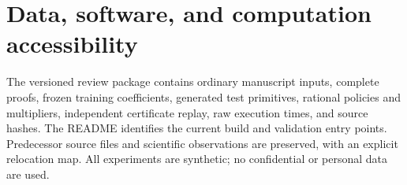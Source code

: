 \documentclass[11pt,letterpaper]{article}
\theoremstyle{definition}
\newcommand{\1}{\mathbf 1}
\begin{document}
\section*{Data, software, and computation accessibility}
The versioned review package contains ordinary manuscript inputs, complete proofs, frozen training coefficients, generated test primitives, rational policies and multipliers, independent certificate replay, raw execution times, and source hashes. The README identifies the current build and validation entry points. Predecessor source files and scientific observations are preserved, with an explicit relocation map. All experiments are synthetic; no confidential or personal data are used.
\clearpage
\end{document}
